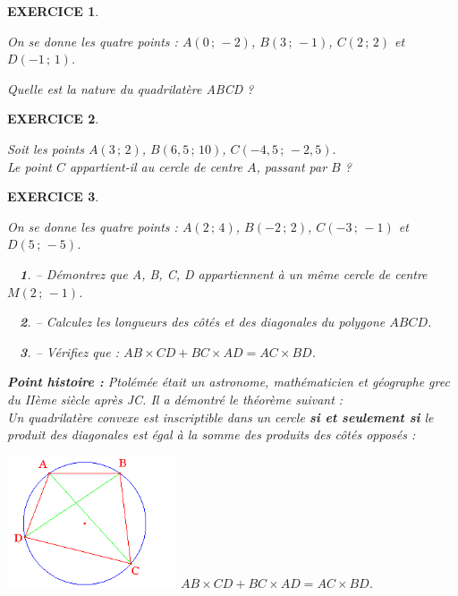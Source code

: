 \documentclass[a4paper]{article}   %
\renewcommand{\(}{\left(}
\renewcommand{\)}{\right)}
\newtheorem{ques}{~}
\newenvironment{qu}{\begin{ques}--} {\end{ques}}
\newtheorem{EXO}{\large EXERCICE }
\newenvironment{EX}   { \setcounter{ques}{0} \begin{EXO} \hrulefill ~\vspace{0.3cm}

\normalfont}    {\end{EXO} \medskip}
\newcommand{\x}{\times} %
\begin{document}
\begin{EX}
On se donne les quatre points : $A(0\,;\,-2)$, $B(3\,;\,-1)$, $C(2\,;\,2)$ et $D(-1\,;\,1)$.

Quelle est la nature du quadrilatère ABCD ?
\end{EX}

\begin{EX}
Soit les points $A(3\,;\,2)$, $B(6,5\,;\,10)$, $C(-4,5\,;\,-2,5).$\\
Le point $C$ appartient-il au cercle de centre $A$, passant par $B$ ?
\end{EX}

\begin{EX}
On se donne les quatre points : $A(2\,;\,4)$, $B(-2\,;\,2)$, $C(-3\,;\,-1)$ et $D(5\,;\,-5)$.
\begin{qu} Démontrez que A, B, C, D appartiennent à un même cercle de centre $M(2\,;\,-1)$.
\end{qu}
\begin{qu} Calculez les longueurs des côtés et des diagonales du polygone $ABCD$.
\end{qu}
\begin{qu} Vérifiez que : $AB\x CD + BC \x AD = AC \x BD$.
\end{qu}
\begin{Sbox}\begin{minipage}{0.9\linewidth}
{\bf{ Point histoire :}} Ptolémée était un astronome, mathématicien et géographe grec du IIème siècle après JC. Il a démontré le théorème suivant : \\
Un quadrilatère convexe est inscriptible dans un cercle {\bf{si et seulement si}} le produit des diagonales est égal à la somme des produits des côtés opposés : 
\begin{center}
\includegraphics[width=5cm]{2ptolem.png} \quad\quad \quad \quad $AB\x CD + BC \x AD = AC \x BD$.
\end{center}
\end{minipage}\end{Sbox}\begin{center}\fbox{\TheSbox}\end{center}

\end{EX}
\end{document}
